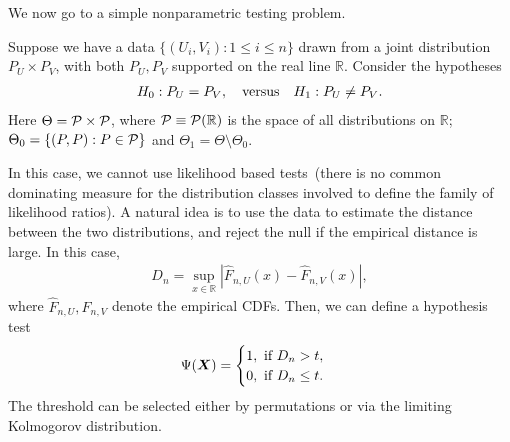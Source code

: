 \documentclass[12pt]{article}
\begin{document}
	We now go to a simple nonparametric testing problem. 
	\begin{example}
		\label{example:two-sample-testing}
		Suppose we have a data $\{(U_i, V_i): 1 \leq i \leq n\}$ drawn \iid from a joint distribution $P_U \times P_V$, with both $P_U, P_V$ supported on the real line $\mathbb{R}$. Consider the hypotheses 
		\begin{align}
		H_0: P_U = P_V, \quad \text{versus} \quad H_1: P_U \neq P_V. 
		\end{align}
		Here $\Theta = {\cal P} \times {\cal P}$, where ${\cal P} \equiv {\cal P}(\mathbb{R})$ is the space of all distributions on $\mathbb{R}$; $\Theta_0 = \{(P, P): P \in {\cal P}\}$ and $\Theta_1 = \Theta \setminus \Theta_0$.

		In this case, we cannot use likelihood based tests~(there is no common dominating measure for the distribution classes involved to define the family of likelihood ratios). A natural idea is to use the data to estimate the distance between the two distributions, and  reject the null if the empirical distance is large. In this case, 
		\begin{align}
			D_{n} = \sup_{x \in  \mathbb{R}} | \hat{F}_{n,U}(x) - \hat{F}_{n, V}(x)|, 
		\end{align}
		where $\hat{F}_{n, U}, \hat{F}_{n, V}$ denote the empirical CDFs. Then, we can define a hypothesis test 
		\begin{align}
		\Psi({\boldsymbol X}) = 
			\begin{cases}
				1, \text{ if } D_n > t, \\	
				0, \text{ if } D_n \leq t.
			\end{cases}
		\end{align}
		The threshold can be selected either by permutations or via the limiting Kolmogorov distribution. 
	\end{example}
\end{document}
